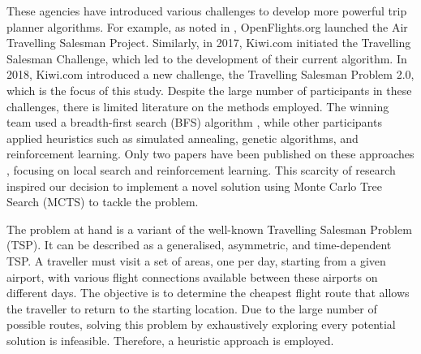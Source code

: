 These agencies have introduced various challenges to develop more powerful trip planner algorithms. For example, as noted in \cite{reinforcement_learning_yaro}, OpenFlights.org launched the Air Travelling Salesman Project. Similarly, in 2017, Kiwi.com initiated the Travelling Salesman Challenge, which led to the development of their current algorithm. In 2018, Kiwi.com introduced a new challenge, the Travelling Salesman Problem 2.0, which is the focus of this study. Despite the large number of participants in these challenges, there is limited literature on the methods employed. The winning team used a breadth-first search (BFS) algorithm \cite{tsp2_award}, while other participants applied heuristics such as simulated annealing, genetic algorithms, and reinforcement learning. Only two papers have been published on these approaches \cite{reinforcement_learning_yaro,local_search_yaro}, focusing on local search and reinforcement learning. This scarcity of research inspired our decision to implement a novel solution using Monte Carlo Tree Search (MCTS) to tackle the problem.

The problem at hand is a variant of the well-known Travelling Salesman Problem (TSP). It can be described as a generalised, asymmetric, and time-dependent TSP. A traveller must visit a set of areas, one per day, starting from a given airport, with various flight connections available between these airports on different days. The objective is to determine the cheapest flight route that allows the traveller to return to the starting location. Due to the large number of possible routes, solving this problem by exhaustively exploring every potential solution is infeasible. Therefore, a heuristic approach is employed.